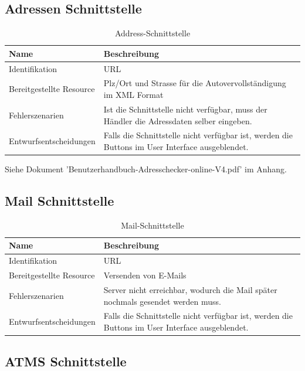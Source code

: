 \subsection{Adressen Schnittstelle}

\begin{table}[H]
	\centering
	\caption{Address-Schnittstelle}
	\begin{tabular}{  | p{4cm} | p{11cm} |}
		\toprule
		{\textbf{Name}} & {\textbf{Beschreibung}} \\
		\midrule
		Identifikation & URL\\ \hline
		Bereitgestellte Resource & Plz/Ort und Strasse für die Autovervollständigung im XML Format \\ \hline
		Fehlerszenarien & Ist die Schnittstelle nicht verfügbar, muss der Händler die Adressdaten selber eingeben.\\ \hline
		Entwurfsentscheidungen & Falls die Schnittstelle nicht verfügbar ist, werden die Buttons im User Interface ausgeblendet.\\
		\bottomrule
	\end{tabular}
\end{table}

Siehe Dokument 'Benutzerhandbuch-Adresschecker-online-V4.pdf' im Anhang.

\subsection{Mail Schnittstelle}

\begin{table}[H]
	\centering
	\caption{Mail-Schnittstelle}
	\begin{tabular}{ | p{4cm} | p{11cm} |}
		\toprule
		{\textbf{Name}} & {\textbf{Beschreibung}} \\
		\midrule
		Identifikation & URL\\ \hline
		Bereitgestellte Resource & Versenden von E-Mails\\ \hline
		Fehlerszenarien & Server nicht erreichbar, wodurch die Mail später nochmals gesendet werden muss.\\ \hline
		Entwurfsentscheidungen & Falls die Schnittstelle nicht verfügbar ist, werden die Buttons im User Interface ausgeblendet.\\
		\bottomrule
	\end{tabular}
\end{table}

\subsection{ATMS Schnittstelle}

